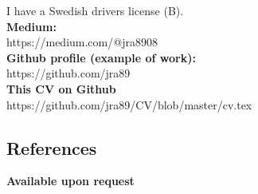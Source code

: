 \documentclass[12pt,a4paper,oneside]{article}
\begin{document}
I have a Swedish drivers license (B). \\

\textbf{Medium:} \\
https://medium.com/@jra8908 \\
\textbf{Github profile (example of work):} \\
https://github.com/jra89 \\
\textbf{This CV on Github} \\
https://github.com/jra89/CV/blob/master/cv.tex \\

\subsection*{References}

\textbf{Available upon request} \\
\end{document}
